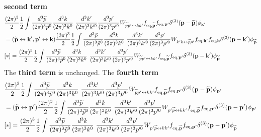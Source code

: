 \documentclass[aps,prd,preprint,nofootinbib,amsmath,amssymb,showpacs,longbibliography,singlecolumn,superscriptaddress,10pt]{revtex4-1}
\theoremstyle{plain}
\theoremstyle{definition}
\begin{document}
\textbf{second term}
%
\begin{equation}
\begin{aligned}
&
\frac{(2 \pi)^{3}}{2} 
\frac{1}{2} \int \frac{d^{3}\widetilde{p}}{(2 \pi)^{3}\Tilde{p}^{0}} 
\frac{d^{3}k}{(2 \pi)^{3} k^{0}} \ \frac{d^{3}k'}{(2 \pi)^{3} k'^{0}} \frac{d^{3}p'}{(2 \pi)^{3} p'^{0}}  
W_{\widetilde{p}p' \leftrightarrow kk'} 
f_{\mathrm{eq},\widetilde{\textbf{p}}}
f_{\mathrm{eq},\textbf{p}'} \delta^{(3)}(\textbf{p} - \widetilde{\textbf{p}})  \phi_{\textbf{k}'} 
\\
&
=
(\widetilde{\textbf{p}} \leftrightarrow \textbf{k}',
\textbf{p}' \leftrightarrow \textbf{k})
\frac{(2 \pi)^{3}}{2} 
\frac{1}{2} \int \frac{d^{3}\widetilde{p}}{(2 \pi)^{3}\Tilde{p}^{0}} 
\frac{d^{3}k}{(2 \pi)^{3} k^{0}} \ \frac{d^{3}k'}{(2 \pi)^{3} k'^{0}} \frac{d^{3}p'}{(2 \pi)^{3} p'^{0}}  
W_{k'k \leftrightarrow \widetilde{p}p'} 
f_{\mathrm{eq},\textbf{k}'}
f_{\mathrm{eq},\textbf{k}} \delta^{(3)}(\textbf{p} - \textbf{k}')  \phi_{\widetilde{\textbf{p}}} 
\\
&
[*]
=
\frac{(2 \pi)^{3}}{2} 
\frac{1}{2} \int \frac{d^{3}\widetilde{p}}{(2 \pi)^{3}\Tilde{p}^{0}} 
\frac{d^{3}k}{(2 \pi)^{3} k^{0}} \ \frac{d^{3}k'}{(2 \pi)^{3} k'^{0}} \frac{d^{3}p'}{(2 \pi)^{3} p'^{0}}  
W_{\widetilde{p}p' \leftrightarrow kk'} 
f_{\mathrm{eq},\widetilde{\textbf{p}}}
f_{\mathrm{eq},\textbf{p}'}
\delta^{(3)}(\textbf{p} - \textbf{k}')  \phi_{\widetilde{\textbf{p}}} 
\end{aligned}    
\end{equation}
% 
The \textbf{third term} is unchanged. The \textbf{fourth term}
%
\begin{equation}
\begin{aligned}
&
\frac{(2 \pi)^{3}}{2} 
\frac{1}{2} \int \frac{d^{3}\widetilde{p}}{(2 \pi)^{3}\Tilde{p}^{0}} 
\frac{d^{3}k}{(2 \pi)^{3} k^{0}} \ \frac{d^{3}k'}{(2 \pi)^{3} k'^{0}} \frac{d^{3}p'}{(2 \pi)^{3} p'^{0}}  
W_{\widetilde{p}p' \leftrightarrow kk'} 
f_{\mathrm{eq},\widetilde{\textbf{p}}}
f_{\mathrm{eq},\textbf{p}'} \delta^{(3)}(\textbf{p} - \widetilde{\textbf{p}})  \phi_{\textbf{p}'} 
\\
&
=
(\widetilde{\textbf{p}} \leftrightarrow \textbf{p}')
\frac{(2 \pi)^{3}}{2} 
\frac{1}{2} \int \frac{d^{3}\widetilde{p}}{(2 \pi)^{3}\Tilde{p}^{0}} 
\frac{d^{3}k}{(2 \pi)^{3} k^{0}} \ \frac{d^{3}k'}{(2 \pi)^{3} k'^{0}} \frac{d^{3}p'}{(2 \pi)^{3} p'^{0}}  
W_{p'\widetilde{p} \leftrightarrow kk'} 
f_{\mathrm{eq},\widetilde{\textbf{p}}}
f_{\mathrm{eq},\textbf{p}'} \delta^{(3)}(\textbf{p} - \textbf{p}')  \phi_{\textbf{p}'} 
\\
&
[*]
=
\frac{(2 \pi)^{3}}{2} 
\frac{1}{2} \int \frac{d^{3}\widetilde{p}}{(2 \pi)^{3}\Tilde{p}^{0}} 
\frac{d^{3}k}{(2 \pi)^{3} k^{0}} \ \frac{d^{3}k'}{(2 \pi)^{3} k'^{0}} \frac{d^{3}p'}{(2 \pi)^{3} p'^{0}}  
W_{p'\widetilde{p} \leftrightarrow kk'} 
f_{\mathrm{eq},\widetilde{\textbf{p}}}
f_{\mathrm{eq},\textbf{p}'} \delta^{(3)}(\textbf{p} - \textbf{p}')  \phi_{\widetilde{\textbf{p}}} 
\end{aligned}    
\end{equation}
%
\end{document}
